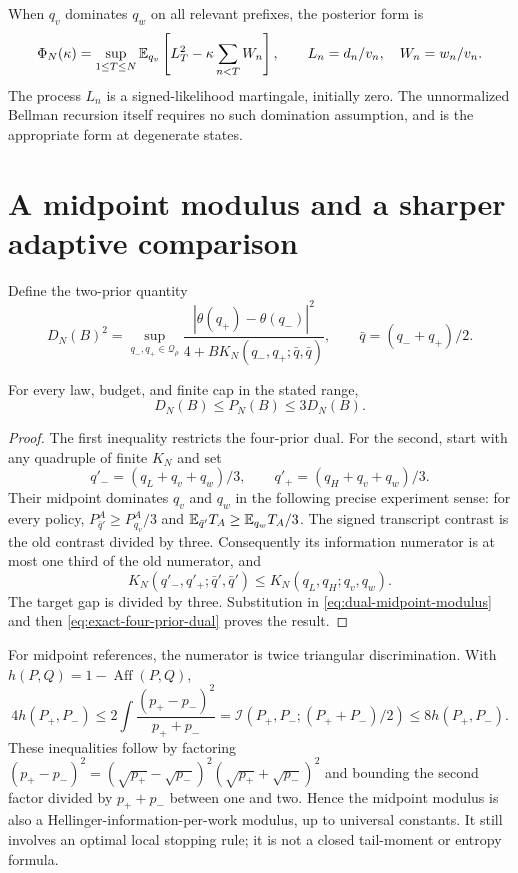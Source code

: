 When $q_v$ dominates $q_w$ on all relevant prefixes, the posterior form is
\[
 \Phi_N(\kappa)=\sup_{1\le T\le N}
 \mathbb E_{q_v}\left[L_T^2-\kappa\sum_{n<T}W_n\right],
 \qquad L_n=d_n/v_n,\quad W_n=w_n/v_n.
\]
The process $L_n$ is a signed-likelihood martingale, initially zero. The
unnormalized Bellman recursion itself requires no such domination
assumption, and is the appropriate form at degenerate states.

\section{A midpoint modulus and a sharper adaptive comparison}
\label{sec:midpoint-dual}

Define the two-prior quantity
\begin{equation}
 D_N(B)^2=
 \sup_{q_-,q_+\in\mathcal Q_\rho}
 \frac{|\theta(q_+)-\theta(q_-)|^2}
 {4+B K_N(q_-,q_+;\bar q,\bar q)},
 \qquad \bar q=(q_-+q_+)/2.
 \label{eq:dual-midpoint-modulus}
\end{equation}

\begin{theorem}\label{thm:midpoint-modulus}
For every law, budget, and finite cap in the stated range,
\begin{equation}
 D_N(B)\le P_N(B)\le3D_N(B).
 \label{eq:dual-midpoint-comparison}
\end{equation}
\end{theorem}

\begin{proof}
The first inequality restricts the four-prior dual. For the second, start
with any quadruple of finite $K_N$ and set
\[
 q'_-=(q_L+q_v+q_w)/3,\qquad q'_+=(q_H+q_v+q_w)/3.
\]
Their midpoint dominates $q_v$ and $q_w$ in the following precise
experiment sense: for every policy,
$P_{\bar q'}^A\ge P_{q_v}^A/3$ and
$\mathbb E_{\bar q'}T_A\ge\mathbb E_{q_w}T_A/3$.
The signed transcript contrast is the old contrast divided by three.
Consequently its information numerator is at most one third of the old
numerator, and
\[
 K_N(q'_-,q'_+;\bar q',\bar q')
 \le K_N(q_L,q_H;q_v,q_w).
\]
The target gap is divided by three. Substitution in
\eqref{eq:dual-midpoint-modulus} and then
\eqref{eq:exact-four-prior-dual} proves the result.
\end{proof}

For midpoint references, the numerator is twice triangular
discrimination. With $h(P,Q)=1-\operatorname{Aff}(P,Q)$,
\begin{equation}
 4h(P_+,P_-)
 \le 2\int\frac{(p_+-p_-)^2}{p_++p_-}
 =\mathcal I(P_+,P_-;(P_++P_-)/2)
 \le8h(P_+,P_-).
 \label{eq:dual-hellinger-comparison}
\end{equation}
These inequalities follow by factoring
$(p_+-p_-)^2=(\sqrt{p_+}-\sqrt{p_-})^2
(\sqrt{p_+}+\sqrt{p_-})^2$ and bounding the second factor divided by
$p_++p_-$ between one and two. Hence the midpoint modulus is also a
Hellinger-information-per-work modulus, up to universal constants. It
still involves an optimal local stopping rule; it is not a closed
tail-moment or entropy formula.

